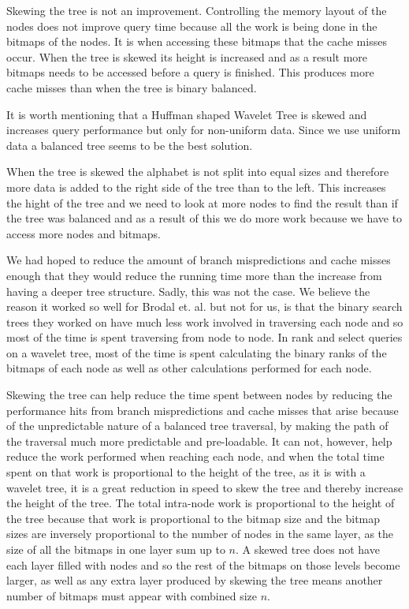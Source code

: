 Skewing the tree is not an improvement. 
Controlling the memory layout of the nodes does not improve query time because all the work is being done in the bitmaps of the nodes.
It is when accessing these bitmaps that the cache misses occur.
When the tree is skewed its height is increased and as a result more bitmaps needs to be accessed before a query is finished. 
This produces more cache misses than when the tree is binary balanced.

It is worth mentioning that a Huffman shaped Wavelet Tree is skewed and increases query performance but only for non-uniform data.
Since we use uniform data a balanced tree seems to be the best solution.





When the tree is skewed the alphabet is not split into equal sizes and therefore more data is added to the right side of the tree than to the left. 
This increases the hight of the tree and we need to look at more nodes to find the result than if the tree was balanced and as a result of this we do more work because we have to access more nodes and bitmaps.

We had hoped to reduce the amount of branch mispredictions and cache misses enough that they would reduce the running time more than the increase from having a deeper tree structure.
Sadly, this was not the case. We believe the reason it worked so well for Brodal et. al. but not for us, is that the binary search trees they worked on have much less work involved in traversing each node and so most of the time is spent traversing from node to node.
In rank and select queries on a wavelet tree, most of the time is spent calculating the binary ranks of the bitmaps of each node as well as other calculations performed for each node.

Skewing the tree can help reduce the time spent between nodes by reducing the performance hits from branch mispredictions and cache misses that arise because of the unpredictable nature of a balanced tree traversal, by making the path of the traversal much more predictable and pre-loadable.
It can not, however, help reduce the work performed when reaching each node, and when the total time spent on that work is proportional to the height of the tree, as it is with a wavelet tree, it is a great reduction in speed to skew the tree and thereby increase the height of the tree.
The total intra-node work is proportional to the height of the tree because that work is proportional to the bitmap size and the bitmap sizes are inversely proportional to the number of nodes in the same layer, as the size of all the bitmaps in one layer sum up to $n$. A skewed tree does not have each layer filled with nodes and so the rest of the bitmaps on those levels become larger, as well as any extra layer produced by skewing the tree means another number of bitmaps must appear with combined size $n$.



